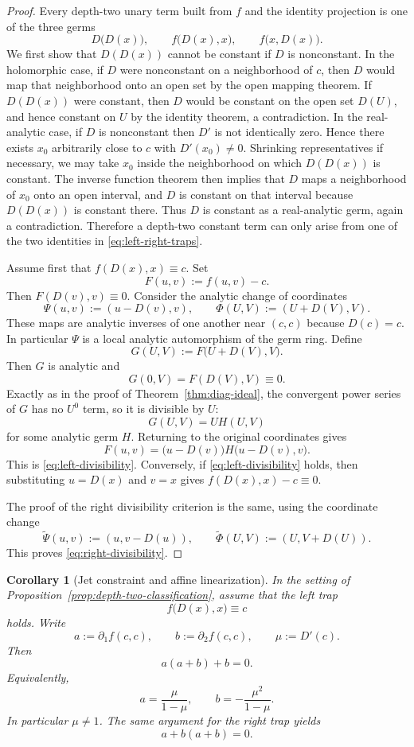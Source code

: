 \documentclass[11pt]{amsart}
\numberwithin{equation}{section}
\newtheorem{corollary}[theorem]{Corollary}
\theoremstyle{remark}
\theoremstyle{definition}
\begin{document}
\begin{proof}
Every depth-two unary term built from $f$ and the identity projection is one of the three germs
\[
D\bigl(D(x)\bigr),\qquad f\bigl(D(x),x\bigr),\qquad f\bigl(x,D(x)\bigr).
\]
We first show that $D(D(x))$ cannot be constant if $D$ is nonconstant. In the holomorphic case, if $D$ were nonconstant on a neighborhood of $c$, then $D$ would map that neighborhood onto an open set by the open mapping theorem. If $D(D(x))$ were constant, then $D$ would be constant on the open set $D(U)$, and hence constant on $U$ by the identity theorem, a contradiction. In the real-analytic case, if $D$ is nonconstant then $D'$ is not identically zero. Hence there exists $x_0$ arbitrarily close to $c$ with $D'(x_0)\neq 0$. Shrinking representatives if necessary, we may take $x_0$ inside the neighborhood on which $D(D(x))$ is constant. The inverse function theorem then implies that $D$ maps a neighborhood of $x_0$ onto an open interval, and $D$ is constant on that interval because $D(D(x))$ is constant there. Thus $D$ is constant as a real-analytic germ, again a contradiction. Therefore a depth-two constant term can only arise from one of the two identities in \eqref{eq:left-right-traps}.

Assume first that $f(D(x),x)\equiv c$. Set
\[
F(u,v):=f(u,v)-c.
\]
Then $F(D(v),v)\equiv 0$. Consider the analytic change of coordinates
\[
\Psi(u,v):=(u-D(v),v),\qquad \Phi(U,V):=(U+D(V),V).
\]
These maps are analytic inverses of one another near $(c,c)$ because $D(c)=c$. In particular $\Psi$ is a local analytic automorphism of the germ ring. Define
\[
G(U,V):=F\bigl(U+D(V),V\bigr).
\]
Then $G$ is analytic and
\[
G(0,V)=F(D(V),V)\equiv 0.
\]
Exactly as in the proof of Theorem~\ref{thm:diag-ideal}, the convergent power series of $G$ has no $U^0$ term, so it is divisible by $U$:
\[
G(U,V)=UH(U,V)
\]
for some analytic germ $H$. Returning to the original coordinates gives
\[
F(u,v)=\bigl(u-D(v)\bigr)H\bigl(u-D(v),v\bigr).
\]
This is \eqref{eq:left-divisibility}. Conversely, if \eqref{eq:left-divisibility} holds, then substituting $u=D(x)$ and $v=x$ gives $f(D(x),x)-c\equiv 0$.

The proof of the right divisibility criterion is the same, using the coordinate change
\[
\widetilde\Psi(u,v):=(u,v-D(u)),\qquad \widetilde\Phi(U,V):=(U,V+D(U)).
\]
This proves \eqref{eq:right-divisibility}.
\end{proof}

\begin{corollary}[Jet constraint and affine linearization]\label{cor:jet-constraint}
In the setting of Proposition~\ref{prop:depth-two-classification}, assume that the left trap
\[
f\bigl(D(x),x\bigr)\equiv c
\]
holds. Write
\[
a:=\partial_1 f(c,c),\qquad b:=\partial_2 f(c,c),\qquad \mu:=D'(c).
\]
Then
\begin{equation}\label{eq:jet-left-trap}
a(a+b)+b=0.
\end{equation}
Equivalently,
\begin{equation}\label{eq:jet-solved}
a=\frac{\mu}{1-\mu},\qquad b=-\frac{\mu^2}{1-\mu}.
\end{equation}
In particular $\mu\neq 1$. The same argument for the right trap yields
\[
a+b(a+b)=0.
\]
\end{corollary}
\end{document}
